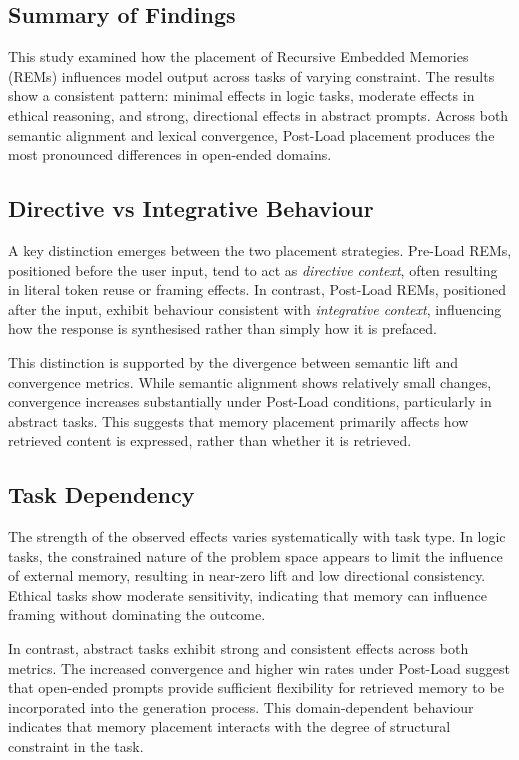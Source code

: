 \documentclass[11pt]{article}
\begin{document}
\subsection{Summary of Findings}

This study examined how the placement of Recursive Embedded Memories (REMs) influences model output across tasks of varying constraint. The results show a consistent pattern: minimal effects in logic tasks, moderate effects in ethical reasoning, and strong, directional effects in abstract prompts. Across both semantic alignment and lexical convergence, Post-Load placement produces the most pronounced differences in open-ended domains.

\subsection{Directive vs Integrative Behaviour}

A key distinction emerges between the two placement strategies. Pre-Load REMs, positioned before the user input, tend to act as \textit{directive context}, often resulting in literal token reuse or framing effects. In contrast, Post-Load REMs, positioned after the input, exhibit behaviour consistent with \textit{integrative context}, influencing how the response is synthesised rather than simply how it is prefaced.

This distinction is supported by the divergence between semantic lift and convergence metrics. While semantic alignment shows relatively small changes, convergence increases substantially under Post-Load conditions, particularly in abstract tasks. This suggests that memory placement primarily affects how retrieved content is expressed, rather than whether it is retrieved.

\subsection{Task Dependency}

The strength of the observed effects varies systematically with task type. In logic tasks, the constrained nature of the problem space appears to limit the influence of external memory, resulting in near-zero lift and low directional consistency. Ethical tasks show moderate sensitivity, indicating that memory can influence framing without dominating the outcome.

In contrast, abstract tasks exhibit strong and consistent effects across both metrics. The increased convergence and higher win rates under Post-Load suggest that open-ended prompts provide sufficient flexibility for retrieved memory to be incorporated into the generation process. This domain-dependent behaviour indicates that memory placement interacts with the degree of structural constraint in the task.
\end{document}
